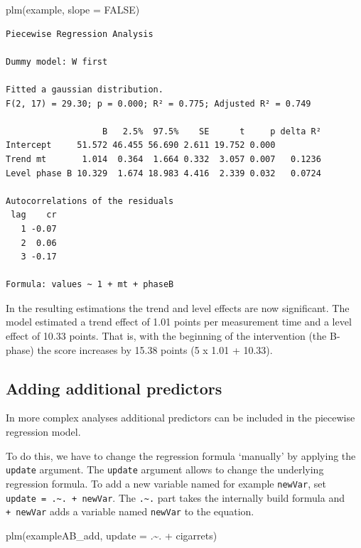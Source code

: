 \documentclass[
  letterpaper,
  DIV=11,
  numbers=noendperiod]{scrreprt}
\newenvironment{Shaded}{\begin{snugshade}}{\end{snugshade}}
\newcommand{\AttributeTok}[1]{\textcolor[rgb]{0.40,0.45,0.13}{#1}}
\newcommand{\ConstantTok}[1]{\textcolor[rgb]{0.56,0.35,0.01}{#1}}
\newcommand{\FunctionTok}[1]{\textcolor[rgb]{0.28,0.35,0.67}{#1}}
\newcommand{\NormalTok}[1]{\textcolor[rgb]{0.00,0.23,0.31}{#1}}
\newcommand{\SpecialCharTok}[1]{\textcolor[rgb]{0.37,0.37,0.37}{#1}}
\begin{document}
\begin{Shaded}
\begin{Highlighting}[]
\FunctionTok{plm}\NormalTok{(example, }\AttributeTok{slope =} \ConstantTok{FALSE}\NormalTok{)}
\end{Highlighting}
\end{Shaded}

\begin{verbatim}
Piecewise Regression Analysis

Dummy model: W first

Fitted a gaussian distribution.
F(2, 17) = 29.30; p = 0.000; R² = 0.775; Adjusted R² = 0.749

                   B   2.5%  97.5%    SE      t     p delta R²
Intercept     51.572 46.455 56.690 2.611 19.752 0.000         
Trend mt       1.014  0.364  1.664 0.332  3.057 0.007   0.1236
Level phase B 10.329  1.674 18.983 4.416  2.339 0.032   0.0724

Autocorrelations of the residuals
 lag    cr
   1 -0.07
   2  0.06
   3 -0.17

Formula: values ~ 1 + mt + phaseB
\end{verbatim}

In the resulting estimations the trend and level effects are now
significant. The model estimated a trend effect of 1.01 points per
measurement time and a level effect of 10.33 points. That is, with the
beginning of the intervention (the B-phase) the score increases by 15.38
points (5 x 1.01 + 10.33).

\hypertarget{adding-additional-predictors}{%
\subsection{Adding additional
predictors}\label{adding-additional-predictors}}

In more complex analyses additional predictors can be included in the
piecewise regression model.

To do this, we have to change the regression formula `manually' by
applying the \texttt{update} argument. The \texttt{update} argument
allows to change the underlying regression formula. To add a new
variable named for example \texttt{newVar}, set
\texttt{update\ =\ .\textasciitilde{}.\ +\ newVar}. The
\texttt{.\textasciitilde{}.} part takes the internally build formula and
\texttt{+\ newVar} adds a variable named \texttt{newVar} to the
equation.

\begin{Shaded}
\begin{Highlighting}[]
\FunctionTok{plm}\NormalTok{(exampleAB\_add, }\AttributeTok{update =}\NormalTok{ .}\SpecialCharTok{\textasciitilde{}}\NormalTok{. }\SpecialCharTok{+}\NormalTok{ cigarrets)}
\end{Highlighting}
\end{Shaded}
\end{document}
